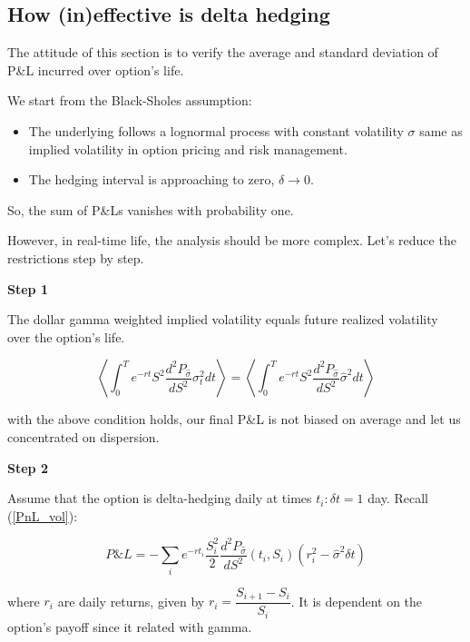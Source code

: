 \documentclass[a4]{article}
\begin{document}
\subsection{How (in)effective is delta hedging}
The attitude of this section is to verify the average and standard deviation of P\&L incurred over option's life.\par 
\noindent We start from the Black-Sholes assumption:\par 
\begin{itemize}
	\item The underlying follows a lognormal process with constant volatility $\sigma$ same as implied volatility in option pricing and risk management.\\
	\item The hedging interval is approaching to zero, $\delta \rightarrow 0$.
\end{itemize}
So, the sum of P\&Ls vanishes with probability one.\par 
However, in real-time life, the analysis should be more complex. Let's reduce the restrictions step by step.\par 
\bigbreak 
\noindent \textbf{Step 1}\par 
The dollar gamma weighted implied volatility equals future realized volatility over the option's life.\par 
\begin{equation}
\left\langle \int^{T}_{0}e^{-rt}S^{2}\dfrac{d^{2}P_{\hat{\sigma}}}{dS^{2}}\sigma_{t}^{2}dt\right \rangle = \left \langle \int^{T}_{0}e^{-rt}S^{2}\dfrac{d^{2}P_{\hat{\sigma}}}{dS^{2}}\hat{\sigma}^{2}dt\right \rangle \end{equation}\par 
with the above condition holds, our final P\&L is not biased on average and let us concentrated on dispersion.\par 
\bigbreak 
\noindent \textbf{Step 2}\par 
Assume that the option is delta-hedging daily at times $t_{i}: \delta t=1$ day. Recall (\ref{PnL_vol}):\par 
\begin{equation}
P\&L = -\sum_{i}e^{-rt_{i}}\dfrac{S_{i}^{2}}{2}\dfrac{d^{2}P_{\hat{\sigma}}}{dS^{2}}(t_{i},S_{i})(r_{i}^{2}-\hat{\sigma}^{2}\delta t)
\end{equation}\par 
where $r_{i}$ are daily returns, given by $r_{i}=\dfrac{S_{i+1}-S_{i}}{S_{i}}$. It is dependent on the option's payoff since it related with gamma.\par 
\end{document}

